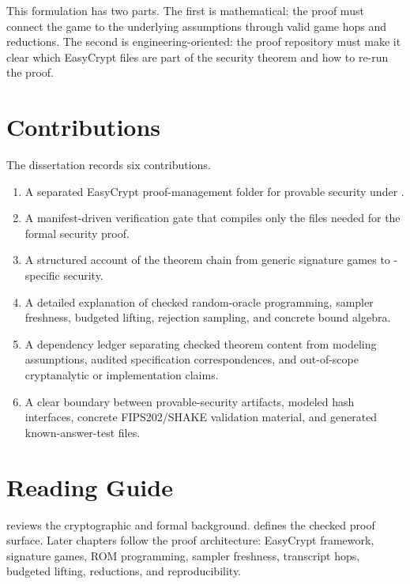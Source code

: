 This formulation has two parts.  The first is mathematical: the proof must
connect the \eufcma{} game to the underlying assumptions through valid game
hops and reductions.  The second is engineering-oriented: the proof repository
must make it clear which EasyCrypt files are part of the security theorem and
how to re-run the proof.

\section{Contributions}

The dissertation records six contributions.

\begin{enumerate}[label=\textbf{C\arabic*.}]
\item A separated EasyCrypt proof-management folder for \haetae{} provable
security under .
\item A manifest-driven verification gate that compiles only the files needed
for the formal security proof.
\item A structured account of the theorem chain from generic signature games to
\haetae{}-specific \eufcma{} security.
\item A detailed explanation of checked random-oracle programming, sampler
freshness, budgeted lifting, rejection sampling, and concrete bound algebra.
\item A dependency ledger separating checked theorem content from modeling
assumptions, audited specification correspondences, and out-of-scope
cryptanalytic or implementation claims.
\item A clear boundary between provable-security artifacts, modeled hash
interfaces, concrete FIPS202/SHAKE validation material, and generated
known-answer-test files.
\end{enumerate}

\section{Reading Guide}

 reviews the cryptographic and formal background.
 defines the checked proof surface.  Later chapters follow
the proof architecture: EasyCrypt framework, signature games, ROM programming,
sampler freshness, transcript hops, budgeted lifting, reductions, and
reproducibility.
